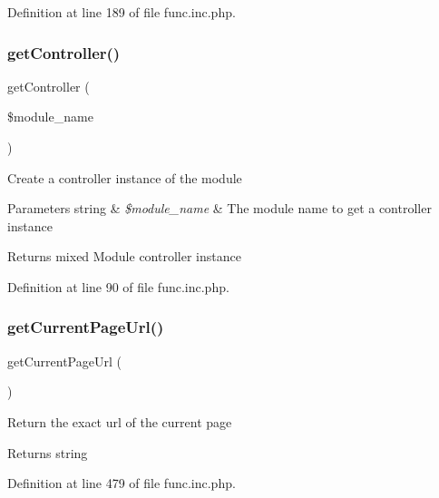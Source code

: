 Definition at line 189 of file func.\+inc.\+php.

\hypertarget{func_8inc_8php_aa08f01e3bf130d770b373ca8493e3e9b}{}\label{func_8inc_8php_aa08f01e3bf130d770b373ca8493e3e9b} 
\subsubsection{\texorpdfstring{get\+Controller()}{getController()}}
{\footnotesize\ttfamily get\+Controller (\begin{DoxyParamCaption}\item[{}]{\$module\+\_\+name }\end{DoxyParamCaption})}

Create a controller instance of the module


\begin{DoxyParams}[1]{Parameters}
string & {\em \$module\+\_\+name} & The module name to get a controller instance \\
\hline
\end{DoxyParams}
\begin{DoxyReturn}{Returns}
mixed Module controller instance 
\end{DoxyReturn}


Definition at line 90 of file func.\+inc.\+php.

\hypertarget{func_8inc_8php_ae9a94dea2a8e11ebf9010683a124fabf}{}\label{func_8inc_8php_ae9a94dea2a8e11ebf9010683a124fabf} 
\subsubsection{\texorpdfstring{get\+Current\+Page\+Url()}{getCurrentPageUrl()}}
{\footnotesize\ttfamily get\+Current\+Page\+Url (\begin{DoxyParamCaption}{ }\end{DoxyParamCaption})}

Return the exact url of the current page

\begin{DoxyReturn}{Returns}
string 
\end{DoxyReturn}


Definition at line 479 of file func.\+inc.\+php.

